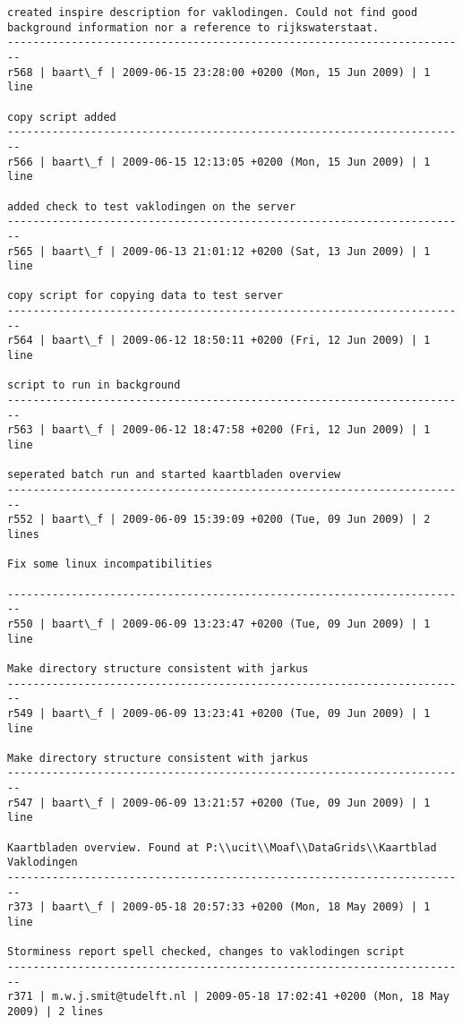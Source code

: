 \documentclass[9]{report}
\begin{document}
\begin{description}
\begin{verbatim}
created inspire description for vaklodingen. Could not find good background information nor a reference to rijkswaterstaat.
------------------------------------------------------------------------
r568 | baart\_f | 2009-06-15 23:28:00 +0200 (Mon, 15 Jun 2009) | 1 line

copy script added
------------------------------------------------------------------------
r566 | baart\_f | 2009-06-15 12:13:05 +0200 (Mon, 15 Jun 2009) | 1 line

added check to test vaklodingen on the server
------------------------------------------------------------------------
r565 | baart\_f | 2009-06-13 21:01:12 +0200 (Sat, 13 Jun 2009) | 1 line

copy script for copying data to test server
------------------------------------------------------------------------
r564 | baart\_f | 2009-06-12 18:50:11 +0200 (Fri, 12 Jun 2009) | 1 line

script to run in background
------------------------------------------------------------------------
r563 | baart\_f | 2009-06-12 18:47:58 +0200 (Fri, 12 Jun 2009) | 1 line

seperated batch run and started kaartbladen overview
------------------------------------------------------------------------
r552 | baart\_f | 2009-06-09 15:39:09 +0200 (Tue, 09 Jun 2009) | 2 lines

Fix some linux incompatibilities

------------------------------------------------------------------------
r550 | baart\_f | 2009-06-09 13:23:47 +0200 (Tue, 09 Jun 2009) | 1 line

Make directory structure consistent with jarkus
------------------------------------------------------------------------
r549 | baart\_f | 2009-06-09 13:23:41 +0200 (Tue, 09 Jun 2009) | 1 line

Make directory structure consistent with jarkus
------------------------------------------------------------------------
r547 | baart\_f | 2009-06-09 13:21:57 +0200 (Tue, 09 Jun 2009) | 1 line

Kaartbladen overview. Found at P:\\ucit\\Moaf\\DataGrids\\Kaartblad Vaklodingen
------------------------------------------------------------------------
r373 | baart\_f | 2009-05-18 20:57:33 +0200 (Mon, 18 May 2009) | 1 line

Storminess report spell checked, changes to vaklodingen script
------------------------------------------------------------------------
r371 | m.w.j.smit@tudelft.nl | 2009-05-18 17:02:41 +0200 (Mon, 18 May 2009) | 2 lines


\end{verbatim}
\end{description}
\end{document}
